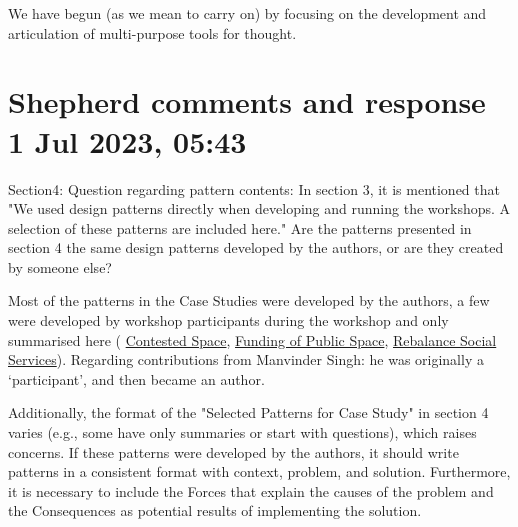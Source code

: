 \documentclass[acmlarge,timestamp]{acmart}
\begin{document}
We have begun (as we mean to carry on) by focusing on the development
and articulation of multi-purpose tools for thought.


\renewcommand\bibname{References}
\renewcommand\refname{References}




\appendix

\section{Shepherd comments and response 1 Jul 2023, 05:43}

\begin{leftbubbles}
\label{Q:developed-by-authors} Section4: Question regarding pattern contents: In section 3, it is mentioned that "We used design patterns directly when developing and running the workshops. A selection of these patterns are included here." Are the patterns presented in section 4 the same design patterns developed by the authors, or are they created by someone else?
\end{leftbubbles}
\begin{rightbubbles}
Most of the patterns in the Case Studies were developed by the
authors, a few were developed by workshop participants during the
workshop and only summarised here ({\sc
  \hyperref[pat:contested-space]{Contested Space}}, {\sc
  \hyperref[pat:funding-of-public-space]{Funding of Public Space}},
{\sc \hyperref[{pat:rebalance-social-services}]{Rebalance Social
    Services}}).  Regarding contributions from Manvinder Singh: he was
originally a ‘participant’, and then became an author.
\end{rightbubbles}

\begin{leftbubbles}
Additionally, the format of the "Selected Patterns for Case Study" in
section 4 varies (e.g., some have only summaries or start with
questions), which raises concerns. If these patterns were developed by
the authors, it should write patterns in a consistent format with
context, problem, and solution. Furthermore, it is necessary to
include the Forces that explain the causes of the problem and the
Consequences as potential results of implementing the solution.
\end{leftbubbles}
\end{document}
